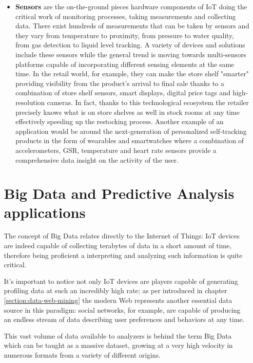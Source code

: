 \begin{itemize}
  \item \textbf{Sensors} are the on-the-ground pieces hardware components of IoT doing the critical work of monitoring processes, taking measurements and collecting data. There exist hundreds of measurements that can be taken by sensors and they vary from temperature to proximity, from pressure to water quality, from gas detection to liquid level tracking. A variety of devices and solutions include these sensors while the general trend is moving towards multi-sensors platforms capable of incorporating different sensing elements at the same time. In the retail world, for example, they can make the store shelf "smarter" providing visibility from the product's arrival to final sale thanks to a combination of store shelf sensors, smart displays, digital price tags and high-resolution cameras. In fact, thanks to this technological ecosystem the retailer precisely knows what is on store shelves as well in stock rooms at any time effectively speeding up the restocking process. 
  Another example of an application would be around the next-generation of personalized self-tracking products in the form of wearables and smartwatches where a combination of accelerometers, GSR, temperature and heart rate sensors provide a comprehensive data insight on the activity of the user.   

\end{itemize} 

\section{Big Data and Predictive Analysis applications}

The concept of Big Data relates directly to the Internet of Things: IoT devices are indeed capable of collecting terabytes of data in a short amount of time, therefore being proficient a interpreting and analyzing such information is quite critical.

It's important to notice not only IoT devices are players capable of generating profiling data at such an incredibly high rate;  as per introduced in chapter \ref{section:data-web-mining} the modern Web represents another essential data source in this paradigm: social networks, for example, are capable of producing an endless stream of data describing user preferences and behaviors at any time.

This vast volume of data available to analyzers is behind the term Big Data which can be taught as a massive dataset, growing at a very high velocity in numerous formats from a variety of different origins.


